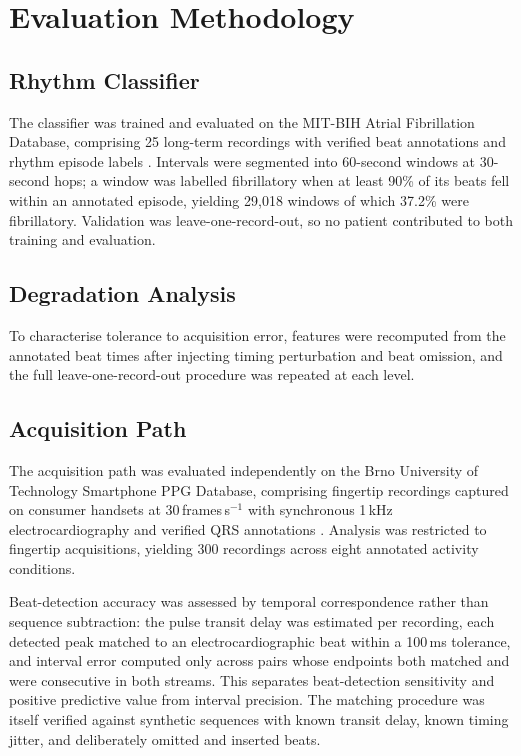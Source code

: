\documentclass[conference]{IEEEtran}
\begin{document}
\section{Evaluation Methodology}

\subsection{Rhythm Classifier}
The classifier was trained and evaluated on the MIT-BIH Atrial Fibrillation
Database, comprising 25 long-term recordings with verified beat annotations and
rhythm episode labels \cite{goldberger2000}. Intervals were segmented into
60-second windows at 30-second
hops; a window was labelled fibrillatory when at least 90\% of its beats fell
within an annotated episode, yielding 29{,}018 windows of which 37.2\% were
fibrillatory. Validation was leave-one-record-out, so no patient contributed to
both training and evaluation.

\subsection{Degradation Analysis}
To characterise tolerance to acquisition error, features were recomputed from the
annotated beat times after injecting timing perturbation and beat omission, and the
full leave-one-record-out procedure was repeated at each level.

\subsection{Acquisition Path}
The acquisition path was evaluated independently on the Brno University of
Technology Smartphone PPG Database, comprising fingertip recordings captured on
consumer handsets at 30\,frames\,s$^{-1}$ with synchronous 1\,kHz
electrocardiography and verified QRS annotations \cite{nemcova2021}. Analysis was
restricted to fingertip acquisitions, yielding 300 recordings across eight
annotated activity conditions.

Beat-detection accuracy was assessed by temporal correspondence rather than
sequence subtraction: the pulse transit delay was estimated per recording, each
detected peak matched to an electrocardiographic beat within a 100\,ms tolerance,
and interval error computed only across pairs whose endpoints both matched and
were consecutive in both streams. This separates beat-detection sensitivity and
positive predictive value from interval precision. The matching procedure was
itself verified against synthetic sequences with known transit delay, known
timing jitter, and deliberately omitted and inserted beats.
\end{document}
